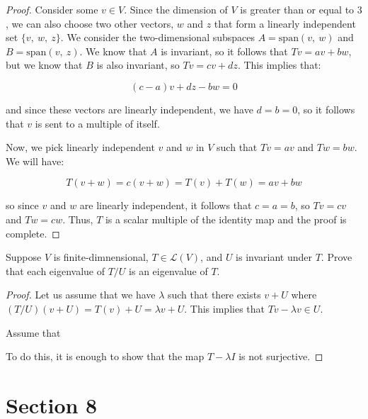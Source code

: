 \documentclass[10pt, oneside]{article}
\newenvironment{problem}[2][Problem]{\begin{trivlist}
\item[\hskip \labelsep {\bfseries #1}\hskip \labelsep {\bfseries #2.}]}{\end{trivlist}}
\begin{document}
    \begin{proof}

      Consider some $v \in V$. Since the dimension of $V$ is greater than or equal to $3$, we can also choose
      two other vectors, $w$ and $z$ that form a linearly independent set $\{v, \ w, \ z\}$.
      We consider the two-dimensional subspaces $A = \text{span}(v, \ w)$ and $B = \text{span}(v, \ z)$. We know that
      $A$ is invariant, so it follows that $Tv = av + bw$, but we know that $B$ is also invariant, so $Tv = cv + dz$. This implies that:

      $$(c - a)v + dz - bw = 0$$

      and since these vectors are linearly independent, we have $d = b = 0$, so it follows that $v$ is sent to a multiple of itself.
      \newline

      Now, we pick linearly independent $v$ and $w$ in $V$ such that $T v = a v$ and $T w = b w$. We will have:

      $$T(v + w) = c(v + w) = T(v) + T(w) = av + bw$$

      so since $v$ and $w$ are linearly independent, it follows that $c = a = b$, so $Tv = cv$ and $Tw = cw$. Thus, $T$ is a scalar multiple of the
      identity map and the proof is complete.

    \end{proof}

    \begin{problem}{5.35}
      Suppose $V$ is finite-dimnensional, $T \in \mathcal{L}(V)$, and $U$ is invariant under $T$. Prove that each eigenvalue of $T/U$ is an eigenvalue of $T$.
    \end{problem}

    \begin{proof}
      Let us assume that we have $\lambda$ such that there exists $v + U$ where $(T/U)(v + U) = T(v) + U = \lambda v + U$. This
      implies that $Tv - \lambda v \in U$.
      \newline

      Assume that 

      To do this, it is enough to show that the map $T - \lambda I$ is not surjective. 

    \end{proof}

    \section{Section 8}
\end{document}
